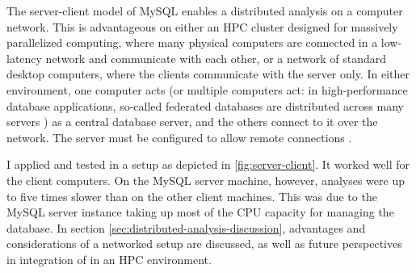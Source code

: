 \label{sec:distributed-analysis}
The server-client model of MySQL enables a distributed analysis on a computer
network. This is advantageous on either an HPC cluster designed for massively
parallelized computing, where many physical computers are connected in a
low-latency network and communicate with each other, or a network of standard
desktop computers, where the clients communicate with the server only. In either
environment, one computer acts (or multiple computers act: in high-performance
database applications, so-called federated databases are distributed across many
servers \citep{schwartz2012}) as a central database server, and the others
connect to it over the network. The server must be configured to allow remote
connections \citep{mysql2013}.



I applied and tested \pname in a setup as depicted in
\autoref{fig:server-client}. It worked well for the client computers. On the
MySQL server machine, however, \pname analyses were up to five times slower than
on the other client machines. This was due to the MySQL server instance taking
up most of the CPU capacity for managing the database. In section
\autoref{sec:distributed-analysis-discussion}, advantages and considerations of
a networked setup are discussed, as well as future perspectives in integration
of \pname in an HPC environment.

